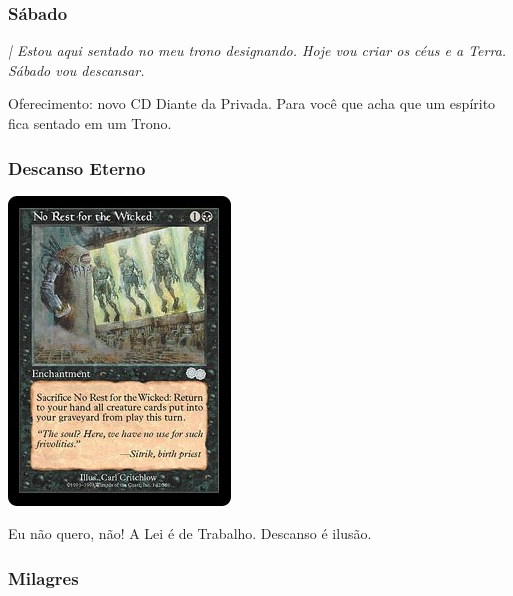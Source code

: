 \documentclass[12pt,a4paper]{article}
\begin{document}
			\subsubsection{S\'abado}
				\begin{flushright}
				\end{flushright}

				\emph{| Estou aqui sentado no meu trono designando. Hoje vou criar os c\'eus e a Terra. S\'abado vou descansar.}

Oferecimento: novo CD Diante da Privada. Para voc\^e que acha que um
esp\'irito fica sentado em um Trono.

			\subsubsection{Descanso Eterno}
				\begin{flushright}
				\end{flushright}

			\begin{center}
			\includegraphics{nrfwicked}
			\end{center}

				Eu n\~ao quero, n\~ao! A Lei \'e de Trabalho. Descanso \'e ilus\~ao.

			\subsubsection{Milagres}
			\begin{flushright}
			\end{flushright}
\end{document}
